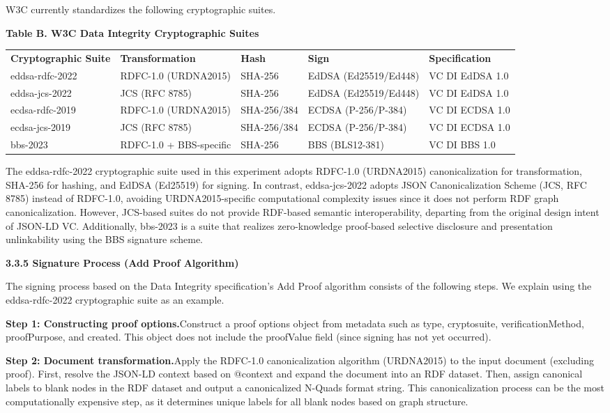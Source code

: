 W3C currently standardizes the following cryptographic suites.

\textbf{Table B. W3C Data Integrity Cryptographic Suites}

\begin{longtable}[]{@{}lllll@{}}
\toprule
\endhead
\textbf{Cryptographic Suite} & \textbf{Transformation} & \textbf{Hash} & \textbf{Sign} & \textbf{Specification}\tabularnewline
eddsa-rdfc-2022 & RDFC-1.0 (URDNA2015) & SHA-256 & EdDSA (Ed25519/Ed448) & VC DI EdDSA 1.0\tabularnewline
eddsa-jcs-2022 & JCS (RFC 8785) & SHA-256 & EdDSA (Ed25519/Ed448) & VC DI EdDSA 1.0\tabularnewline
ecdsa-rdfc-2019 & RDFC-1.0 (URDNA2015) & SHA-256/384 & ECDSA (P-256/P-384) & VC DI ECDSA 1.0\tabularnewline
ecdsa-jcs-2019 & JCS (RFC 8785) & SHA-256/384 & ECDSA (P-256/P-384) & VC DI ECDSA 1.0\tabularnewline
bbs-2023 & RDFC-1.0 + BBS-specific & SHA-256 & BBS (BLS12-381) & VC DI BBS 1.0\tabularnewline
\bottomrule
\end{longtable}

The eddsa-rdfc-2022 cryptographic suite used in this experiment adopts RDFC-1.0 (URDNA2015) canonicalization for transformation, SHA-256 for hashing, and EdDSA (Ed25519) for signing. In contrast, eddsa-jcs-2022 adopts JSON Canonicalization Scheme (JCS, RFC 8785) instead of RDFC-1.0, avoiding URDNA2015-specific computational complexity issues since it does not perform RDF graph canonicalization. However, JCS-based suites do not provide RDF-based semantic interoperability, departing from the original design intent of JSON-LD VC. Additionally, bbs-2023 is a suite that realizes zero-knowledge proof-based selective disclosure and presentation unlinkability using the BBS signature scheme.

\textbf{3.3.5 Signature Process (Add Proof Algorithm)}

The signing process based on the Data Integrity specification's Add Proof algorithm consists of the following steps. We explain using the eddsa-rdfc-2022 cryptographic suite as an example.

\textbf{Step 1: Constructing proof options.}Construct a proof options object from metadata such as type, cryptosuite, verificationMethod, proofPurpose, and created. This object does not include the proofValue field (since signing has not yet occurred).

\textbf{Step 2: Document transformation.}Apply the RDFC-1.0 canonicalization algorithm (URDNA2015) to the input document (excluding proof). First, resolve the JSON-LD context based on @context and expand the document into an RDF dataset. Then, assign canonical labels to blank nodes in the RDF dataset and output a canonicalized N-Quads format string. This canonicalization process can be the most computationally expensive step, as it determines unique labels for all blank nodes based on graph structure.

